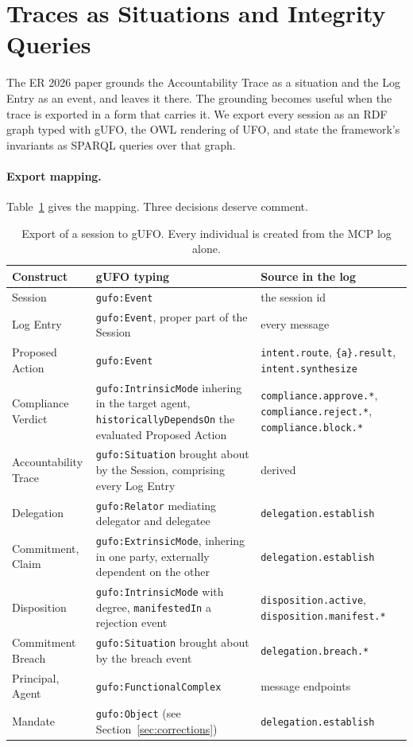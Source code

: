 \documentclass[runningheads]{llncs}
\newcommand{\code}[1]{\texttt{#1}}
\begin{document}
\section{Traces as Situations and Integrity Queries}
\label{sec:traces}

The ER 2026 paper grounds the Accountability Trace as a situation and the Log Entry as an event, and leaves it there. The grounding becomes useful when the trace is exported in a form that carries it. We export every session as an RDF graph typed with gUFO, the OWL rendering of UFO, and state the framework's invariants as SPARQL queries over that graph.

\paragraph{Export mapping.}
Table~\ref{tab:mapping} gives the mapping. Three decisions deserve comment.

\begin{table}[tb]
\centering
\caption{Export of a session to gUFO. Every individual is created from the MCP log alone.}
\label{tab:mapping}
\begin{tabularx}{\textwidth}{@{}lXX@{}}
\toprule
\textbf{Construct} & \textbf{gUFO typing} & \textbf{Source in the log} \\
\midrule
Session & \code{gufo:Event} & the session id \\
Log Entry & \code{gufo:Event}, proper part of the Session & every message \\
Proposed Action & \code{gufo:Event} & \code{intent.route}, \code{\{a\}.result}, \code{intent.synthesize} \\
Compliance Verdict & \code{gufo:IntrinsicMode} inhering in the target agent, \code{historicallyDependsOn} the evaluated Proposed Action & \code{compliance.approve.*}, \code{compliance.reject.*}, \code{compliance.block.*} \\
Accountability Trace & \code{gufo:Situation} brought about by the Session, comprising every Log Entry & derived \\
Delegation & \code{gufo:Relator} mediating delegator and delegatee & \code{delegation.establish} \\
Commitment, Claim & \code{gufo:ExtrinsicMode}, inhering in one party, externally dependent on the other & \code{delegation.establish} \\
Disposition & \code{gufo:IntrinsicMode} with degree, \code{manifestedIn} a rejection event & \code{disposition.active}, \code{disposition.manifest.*} \\
Commitment Breach & \code{gufo:Situation} brought about by the breach event & \code{delegation.breach.*} \\
Principal, Agent & \code{gufo:FunctionalComplex} & message endpoints \\
Mandate & \code{gufo:Object} (see Section~\ref{sec:corrections}) & \code{delegation.establish} \\
\bottomrule
\end{tabularx}
\end{table}
\end{document}
